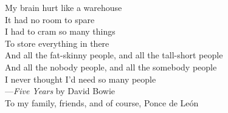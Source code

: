 \documentclass{ucbthesis}
\begin{document}
\begin{frontmatter}

\begin{dedication}
\begin{center}
\vfil\null
My brain hurt like a warehouse\\
It had no room to spare\\
I had to cram so many things\\
To store everything in there\\
And all the fat-skinny people, and all the tall-short people\\
And all the nobody people, and all the somebody people\\
I never thought I'd need so many people\\
\vspace{5 mm}
---\textit{Five Years} by David Bowie\\
\vspace{30 mm}
To my family, friends, and of course, Ponce de Le\'on\\
\end{center}
\end{dedication}

\tableofcontents

\begin{acknowledgements}


\end{acknowledgements}
\end{frontmatter}
\end{document}
